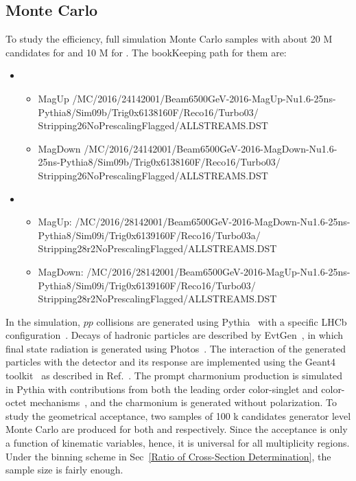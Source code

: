 \subsection{Monte Carlo}
To study the efficiency, full simulation Monte Carlo samples with about 20 M candidates for \jpsi and 10 M for \psitwos. The bookKeeping path for them are:
\begin{itemize}
    \item \jpsi
    \begin{itemize}
        \item MagUp /MC/2016/24142001/Beam6500GeV-2016-MagUp-Nu1.6-25ns-Pythia8/Sim09b/Trig0x6138160F/Reco16/Turbo03/ \\
        Stripping26NoPrescalingFlagged/ALLSTREAMS.DST
        \item MagDown /MC/2016/24142001/Beam6500GeV-2016-MagDown-Nu1.6-25ns-Pythia8/Sim09b/Trig0x6138160F/Reco16/Turbo03/ \\
        Stripping26NoPrescalingFlagged/ALLSTREAMS.DST
    \end{itemize}
    \item \psitwos
    \begin{itemize}
        \item MagUp: /MC/2016/28142001/Beam6500GeV-2016-MagDown-Nu1.6-25ns-Pythia8/Sim09i/Trig0x6139160F/Reco16/Turbo03a/ \\
        Stripping28r2NoPrescalingFlagged/ALLSTREAMS.DST
        \item MagDown: /MC/2016/28142001/Beam6500GeV-2016-MagUp-Nu1.6-25ns-Pythia8/Sim09i/Trig0x6139160F/Reco16/Turbo03/ \\
        Stripping28r2NoPrescalingFlagged/ALLSTREAMS.DST
    \end{itemize}
\end{itemize}
In the simulation, $pp$ collisions are generated using Pythia~\cite{Ball:2006wn} with a specific LHCb configuration~\cite{LHCb:2011dpk}. Decays of hadronic 
particles are described by EvtGen~\cite{Lange:2001uf}, in which final state radiation is generated using Photos~\cite{Golonka:2005pn}. The 
interaction of the generated particles with the detector and its response are implemented using the Geant4 
toolkit~\cite{GEANT4:2002zbu} as described in Ref.~\cite{Clemencic:2011zza}. The prompt charmonium production is simulated in Pythia with 
contributions from both the leading order color-singlet and color-octet mechanisms~\cite{LHCb:2011dpk,Bargiotti:2007zz}, and the charmonium 
is generated without polarization.
To study the geometrical acceptance, two samples of 100 k candidates generator level Monte Carlo are produced for both \jpsi and \psitwos respectively. Since the 
acceptance is only a function of kinematic variables, hence, it is universal for all multiplicity regions. Under the binning scheme in Sec~\ref{Ratio of Cross-Section Determination}, the sample size is fairly enough.


